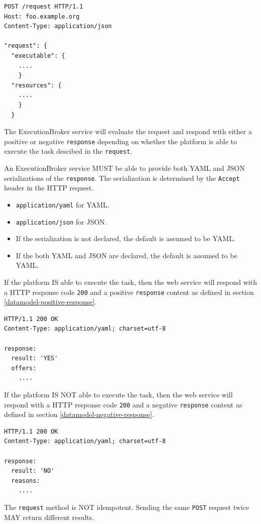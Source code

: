 \documentclass[11pt,a4paper]{ivoa}
\newcommand{\json} {JSON}
\newcommand{\yaml} {YAML}
\newcommand{\webservice} {web service}
\newcommand{\execbrokerclass} {ExecutionBroker}
\newcommand{\codeword}[1] {\texttt{#1}}
\begin{document}
\begin{lstlisting}[]
POST /request HTTP/1.1
Host: foo.example.org
Content-Type: application/json

"request": {
  "executable": {
    ....
    }
  "resources": {
    ....
    }
  }
\end{lstlisting}

The \execbrokerclass{} service will evaluate the request and respond with either a positive
or negative \codeword{response} depending on whether the platform is able to execute the
task descibed in the \codeword{request}.

An \execbrokerclass{} service MUST be able to provide both \yaml{} and \json{} serializations
of the \codeword{response}.
The serialization is determined by the \codeword{Accept} header in the HTTP request.
\begin{itemize}
    \item \codeword{application/yaml} for \yaml{}.
    \item \codeword{application/json} for \json.
    \item If the serialization is not declared, the default is assumed to be \yaml{}.
    \item If the both \yaml{} and \json{} are declared, the default is assumed to be \yaml{}.
\end{itemize}

If the platform IS able to execute the task, then the \webservice{} will respond with a
HTTP response code \codeword{200} and a positive \codeword{response} content as defined
in section \ref{datamodel-positive-response}.

\begin{lstlisting}[]
HTTP/1.1 200 OK
Content-Type: application/yaml; charset=utf-8

response:
  result: 'YES'
  offers:
    ....
\end{lstlisting}

If the platform IS NOT able to execute the task, then the \webservice{} will respond with a
HTTP response code \codeword{200} and a negative \codeword{response} content as defined
in section \ref{datamodel-negative-response}.

\begin{lstlisting}[]
HTTP/1.1 200 OK
Content-Type: application/yaml; charset=utf-8

response:
  result: 'NO'
  reasons:
    ....
\end{lstlisting}

The \codeword{request} method is NOT idempotent. Sending the same \codeword{POST} request
twice MAY return different results.
\end{document}
